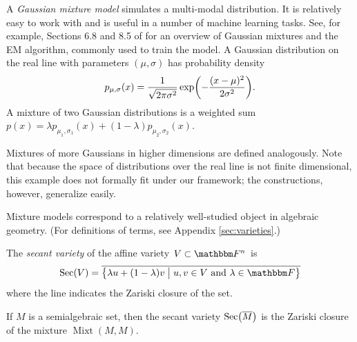 \documentclass[11pt,titlepage]{article}
\newcommand*{\vbar}{\;\big\vert\;}
\DeclareMathOperator{\Mixt}{Mixt}
\DeclareMathOperator{\Sec}{Sec}
\numberwithin{equation}{section}
\begin{document}
    \begin{example}
    A \emph{Gaussian mixture model} simulates a multi-modal distribution.  It is
    relatively easy to work with and is useful in a number of machine learning
    tasks.  See, for example, Sections 6.8 and 8.5 of \cite{EOSL} for an
    overview of Gaussian mixtures and the EM algorithm, commonly used to train
    the model.  A Gaussian distribution on the real line with parameters $(\mu,
    \sigma)$ has probability density
    \[
        p_{\mu, \sigma}(x) = \frac{1}{\sqrt{2\pi\sigma^2}} 
        \exp\pdil*{-\frac{(x - \mu)^2}{2\sigma^2}}.
    \]
    A mixture of two Gaussian distributions is a weighted sum $p(x) = \lambda
    p_{\mu_1, \sigma_1}(x) + (1 - \lambda)p_{\mu_2, \sigma_2}(x)$.  
    \begin{center}
    \end{center}
    Mixtures of more Gaussians in higher dimensions are defined analogously.
    Note that because the space of distributions over the real line is not
    finite dimensional, this example does not formally fit under our framework;
    the constructions, however, generalize easily.
    \end{example}

    Mixture models correspond to a relatively well-studied object in algebraic
    geometry.  (For definitions of terms, see Appendix \ref{sec:varieties}.)
    \begin{definition}
    The \emph{secant variety} of the affine variety $V \subset \F^n$ is
    \[
        \Sec(V) = \overline{\cdil[\big]{
        \lambda u + (1 - \lambda) v \vbar
        u,v \in V
        \text{ and }
        \lambda \in \F
        }}
    \]
    where the line indicates the Zariski closure of the set.  
    \end{definition}
    \begin{proposition}
    If $M$ is a semialgebraic set, then the secant variety
    $\Sec\pdil[\big]{\overline{M}}$ is the Zariski closure of the mixture
    $\Mixt(M, M)$.
    \end{proposition}
\end{document}
